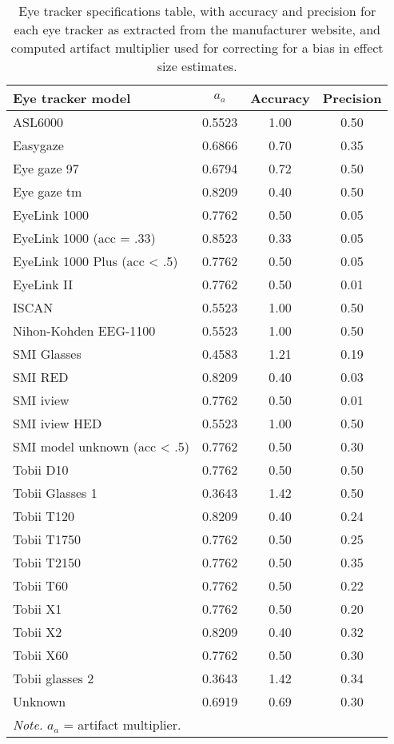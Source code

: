 \begin{table}[ht]
\centering
\caption{Eye tracker specifications table, with accuracy and precision for each eye tracker as extracted from the manufacturer website, and computed artifact multiplier used for correcting for a bias in effect size estimates.} 
\label{tab:eyetracker_specifications}
\begin{tabular}{lccc}
  \hline
Eye tracker model & $a_a$ & Accuracy & Precision \\ 
  \hline
ASL6000 & 0.5523 & 1.00 & 0.50 \\ 
  Easygaze & 0.6866 & 0.70 & 0.35 \\ 
  Eye gaze 97 & 0.6794 & 0.72 & 0.50 \\ 
  Eye gaze tm & 0.8209 & 0.40 & 0.50 \\ 
  EyeLink 1000 & 0.7762 & 0.50 & 0.05 \\ 
  EyeLink 1000 (acc = .33) & 0.8523 & 0.33 & 0.05 \\ 
  EyeLink 1000 Plus (acc < .5) & 0.7762 & 0.50 & 0.05 \\ 
  EyeLink II & 0.7762 & 0.50 & 0.01 \\ 
  ISCAN & 0.5523 & 1.00 & 0.50 \\ 
  Nihon-Kohden EEG-1100 & 0.5523 & 1.00 & 0.50 \\ 
  SMI Glasses & 0.4583 & 1.21 & 0.19 \\ 
  SMI RED & 0.8209 & 0.40 & 0.03 \\ 
  SMI iview & 0.7762 & 0.50 & 0.01 \\ 
  SMI iview HED & 0.5523 & 1.00 & 0.50 \\ 
  SMI model unknown (acc < .5) & 0.7762 & 0.50 & 0.30 \\ 
  Tobii D10 & 0.7762 & 0.50 & 0.50 \\ 
  Tobii Glasses 1 & 0.3643 & 1.42 & 0.50 \\ 
  Tobii T120 & 0.8209 & 0.40 & 0.24 \\ 
  Tobii T1750 & 0.7762 & 0.50 & 0.25 \\ 
  Tobii T2150 & 0.7762 & 0.50 & 0.35 \\ 
  Tobii T60 & 0.7762 & 0.50 & 0.22 \\ 
  Tobii X1 & 0.7762 & 0.50 & 0.20 \\ 
  Tobii X2 & 0.8209 & 0.40 & 0.32 \\ 
  Tobii X60 & 0.7762 & 0.50 & 0.30 \\ 
  Tobii glasses 2 & 0.3643 & 1.42 & 0.34 \\ 
  Unknown & 0.6919 & 0.69 & 0.30 \\ 
   \hline 
 \multicolumn{4}{l}{\scriptsize{\textit{Note.} $a_a$ = artifact multiplier.}} 
\end{tabular}
\end{table}
